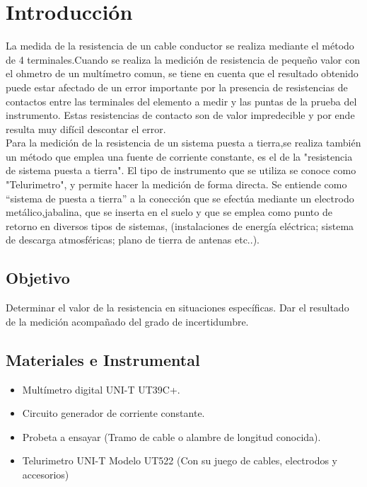 \documentclass[12pt, letterpaper]{article}
\begin{document}
\newpage
\tableofcontents
\newpage
\section{Introducción}

La medida de la resistencia de un cable conductor se realiza mediante 
el método de 4 terminales.Cuando se realiza la medición de resistencia
de pequeño valor con el ohmetro de un multímetro comun, se tiene en cuenta
que el resultado obtenido puede estar afectado de un error importante
por la presencia de resistencias de contactos entre las terminales del
elemento a medir y las puntas de la prueba del instrumento. Estas resistencias
de contacto son de valor impredecible y por ende resulta muy difícil descontar 
el error. \\
Para la medición de la resistencia de un sistema puesta a tierra,se realiza 
también un método que emplea una fuente de corriente constante, es el de la "resistencia
de sistema puesta a tierra". El tipo de instrumento que se utiliza se conoce como
"Telurimetro", y permite hacer la medición de forma directa. Se entiende como “sistema de puesta a tierra” 
a la conección que se efectúa mediante un electrodo metálico,jabalina, que se inserta en el suelo y 
que se emplea como punto de retorno en diversos tipos de sistemas, (instalaciones de energía 
eléctrica; sistema de descarga atmosféricas; plano de tierra de antenas etc..).

\subsection{Objetivo}
Determinar el valor de la resistencia en situaciones específicas. Dar el resultado de la
medición acompañado del grado de incertidumbre.

\subsection{Materiales e Instrumental}
\begin{itemize}
	\item Multímetro digital UNI-T UT39C+.
	\item Circuito generador de corriente constante.
	\item Probeta a ensayar (Tramo de cable o alambre de longitud conocida).
	\item Telurimetro UNI-T Modelo UT522 (Con su juego de cables, electrodos y accesorios)
\end{itemize}
\end{document}
